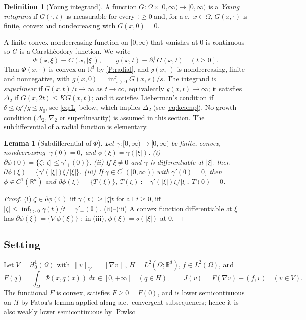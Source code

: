 \documentclass[11pt]{amsart}
\newtheorem{lemma}[theorem]{Lemma}
\theoremstyle{definition}
\newtheorem{definition}[theorem]{Definition}
\theoremstyle{remark}
\numberwithin{equation}{section}
\newcommand{\R}{\mathbb{R}}
\newcommand{\dx}{\,dx}
\newcommand{\abs}[1]{\lvert #1\rvert}
\newcommand{\norm}[1]{\lVert #1\rVert}
\begin{document}
\begin{definition}[Young integrand]\label{def:young}
A function $G\colon\Omega\times[0,\infty)\to[0,\infty)$ is a \emph{Young integrand} if $G(\cdot,t)$ is measurable for every $t\ge0$ and, for a.e.\ $x\in\Omega$, $G(x,\cdot)$ is finite, convex and nondecreasing with $G(x,0)=0$.
\end{definition}
A finite convex nondecreasing function on $[0,\infty)$ that vanishes at $0$ is continuous, so $G$ is a Carath\'eodory function. We write
\[
\Phi(x,\xi)=G(x,\abs\xi),\qquad g(x,t)=\partial_t^+G(x,t)\quad(t\ge0).
\]
Then $\Phi(x,\cdot)$ is convex on $\R^d$ by \ref{P:radial}, and $g(x,\cdot)$ is nondecreasing, finite and nonnegative, with $g(x,0)=\inf_{s>0}G(x,s)/s$. The integrand is \emph{superlinear} if $G(x,t)/t\to\infty$ as $t\to\infty$, equivalently $g(x,t)\to\infty$; it satisfies $\Delta_2$ if $G(x,2t)\le KG(x,t)$; and it satisfies Lieberman's condition \cite[(1.1)$'$]{Lieberman1991} if $\delta\le tg'/g\le g_0$, see \eqref{eq:L} below, which implies $\Delta_2$ (see \eqref{eq:kcomp}). No growth condition ($\Delta_2$, $\nabla_2$ or superlinearity) is assumed in this section. The subdifferential of a radial function is elementary.

\begin{lemma}[Subdifferential of $\Phi$]\label{lem:subdiff-Phi}
Let $\gamma\colon[0,\infty)\to[0,\infty)$ be finite, convex, nondecreasing, $\gamma(0)=0$, and $\phi(\xi)=\gamma(\abs\xi)$.
\textup{(i)} $\partial\phi(0)=\{\zeta:\abs\zeta\le\gamma'_+(0)\}$.
\textup{(ii)} If $\xi\ne0$ and $\gamma$ is differentiable at $\abs\xi$, then $\partial\phi(\xi)=\{\gamma'(\abs\xi)\xi/\abs\xi\}$.
\textup{(iii)} If $\gamma\in C^1([0,\infty))$ with $\gamma'(0)=0$, then $\phi\in C^1(\R^d)$ and $\partial\phi(\xi)=\{T(\xi)\}$, $T(\xi):=\gamma'(\abs\xi)\xi/\abs\xi$, $T(0)=0$.
\end{lemma}
\begin{proof}
(i) $\zeta\in\partial\phi(0)$ iff $\gamma(t)\ge\abs\zeta t$ for all $t\ge0$, iff $\abs\zeta\le\inf_{t>0}\gamma(t)/t=\gamma'_+(0)$. (ii)--(iii) A convex function differentiable at $\xi$ has $\partial\phi(\xi)=\{\nabla\phi(\xi)\}$ \cite[Thm.~25.1]{Rockafellar1970}; %
in (iii), $\phi(\xi)=o(\abs\xi)$ at $0$.
\end{proof}

\subsection{Setting}\label{ssec:setting}
Let $V=H^1_0(\Omega)$ with $\norm{v}_V=\norm{\nabla v}$, $H=L^2(\Omega;\R^d)$, $f\in L^2(\Omega)$, and
\[
F(q)=\int_\Omega\Phi(x,q(x))\dx\in[0,+\infty]\quad(q\in H),\qquad J(v)=F(\nabla v)-(f,v)\quad(v\in V).
\]
The functional $F$ is convex, satisfies $F\ge0=F(0)$, and is lower semicontinuous on $H$ by Fatou's lemma applied along a.e.\ convergent subsequences; hence it is also weakly lower semicontinuous by \ref{P:wlsc}.
\end{document}
